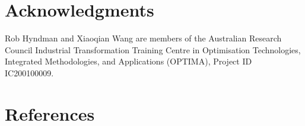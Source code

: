 \documentclass[
  11pt,
  12pt]{article}
\theoremstyle{plain}
\theoremstyle{remark}
\begin{document}
\section*{Acknowledgments}\label{acknowledgments}

Rob Hyndman and Xiaoqian Wang are members of the Australian Research
Council Industrial Transformation Training Centre in Optimisation
Technologies, Integrated Methodologies, and Applications (OPTIMA),
Project ID IC200100009.~

\section*{References}\label{references}

\renewcommand{\bibsection}{}

\end{document}

